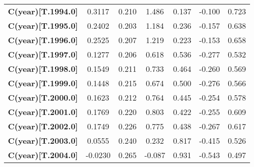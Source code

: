 \begin{center}
\begin{tabular}{lcccccc}
\textbf{C(year)[T.1994.0]}                                                                          &       0.3117  &        0.210     &     1.486  &         0.137        &       -0.100    &        0.723     \\
\textbf{C(year)[T.1995.0]}                                                                          &       0.2402  &        0.203     &     1.184  &         0.236        &       -0.157    &        0.638     \\
\textbf{C(year)[T.1996.0]}                                                                          &       0.2525  &        0.207     &     1.219  &         0.223        &       -0.153    &        0.658     \\
\textbf{C(year)[T.1997.0]}                                                                          &       0.1277  &        0.206     &     0.618  &         0.536        &       -0.277    &        0.532     \\
\textbf{C(year)[T.1998.0]}                                                                          &       0.1549  &        0.211     &     0.733  &         0.464        &       -0.260    &        0.569     \\
\textbf{C(year)[T.1999.0]}                                                                          &       0.1448  &        0.215     &     0.674  &         0.500        &       -0.276    &        0.566     \\
\textbf{C(year)[T.2000.0]}                                                                          &       0.1623  &        0.212     &     0.764  &         0.445        &       -0.254    &        0.578     \\
\textbf{C(year)[T.2001.0]}                                                                          &       0.1769  &        0.220     &     0.803  &         0.422        &       -0.255    &        0.609     \\
\textbf{C(year)[T.2002.0]}                                                                          &       0.1749  &        0.226     &     0.775  &         0.438        &       -0.267    &        0.617     \\
\textbf{C(year)[T.2003.0]}                                                                          &       0.0555  &        0.240     &     0.232  &         0.817        &       -0.415    &        0.526     \\
\textbf{C(year)[T.2004.0]}                                                                          &      -0.0230  &        0.265     &    -0.087  &         0.931        &       -0.543    &        0.497     \\

\end{tabular}
\end{center}
